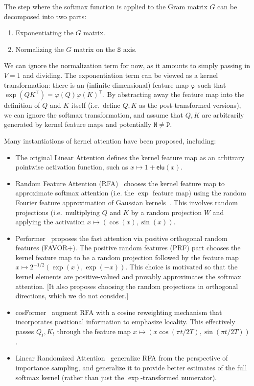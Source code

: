 \documentclass{article}
\newcommand{\citep}{\parencite}
\begin{document}
The step where the softmax function is applied to the Gram matrix $G$ can be decomposed into two parts:
\begin{enumerate}
  \item Exponentiating the $G$ matrix.
  \item Normalizing the $G$ matrix on the $\mathtt{S}$ axis.
\end{enumerate}
We can ignore the normalization term for now, as it amounts to simply passing in $V=1$ and dividing\iftoggle{arxiv}{ (we revisit this in \cref{sec:architecture:kernels})}{}.
The exponentiation term can be viewed as a kernel transformation:
there is an (infinite-dimensional) feature map $\varphi$ such that $\exp(QK^{\top}) = \varphi(Q)\varphi(K)^{\top}$.
By abstracting away the feature map into the definition of $Q$ and $K$ itself (i.e.\ define $Q, K$ as the post-transformed versions),
we can ignore the softmax transformation, and assume that $Q, K$ are arbitrarily generated by kernel feature maps and potentially $\mathtt{N} \neq \mathtt{P}$.

Many instantiations of kernel attention have been proposed, including:
\begin{itemize}
  \item The original Linear Attention \citep{katharopoulos2020transformers} defines the kernel feature map as an arbitrary pointwise activation function, such as $x \mapsto 1+\mathsf{elu}(x)$.
  \item Random Feature Attention (RFA)~\citep{peng2021random} chooses the kernel feature map to approximate softmax attention (i.e. the $\exp$ feature map) using the random Fourier feature approximation of Gaussian kernels~\citep{rahimi2007random}. This involves random projections (i.e.\ multiplying $Q$ and $K$ by a random projection $W$ and applying the activation $x \mapsto (\cos(x), \sin(x))$.
  \item Performer~\citep{choromanski2021rethinking} proposes the fast attention via positive orthogonal random features (FAVOR+).
    The positive random features (PRF) part chooses the kernel feature map to be a random projection followed by the feature map $x \mapsto 2^{-1/2}(\exp(x), \exp(-x))$.
    This choice is motivated so that the kernel elements are positive-valued and provably approximates the softmax attention. [It also proposes choosing the random projections in orthogonal directions, which we do not consider.]
  \item cosFormer~\citep{qin2022cosformer} augment RFA with a cosine reweighting mechanism that incorporates positional information to emphasize locality.
    This effectively passes $Q_t,K_t$ through the feature map $x \mapsto (x \cos(\pi t / 2T), \sin(\pi t / 2T))$.
  \item Linear Randomized Attention~\citep{zheng2022linear} generalize RFA from the perspective of importance sampling, and generalize it to provide better estimates of the full softmax kernel (rather than just the $\exp$-transformed numerator).
\end{itemize}
\end{document}
